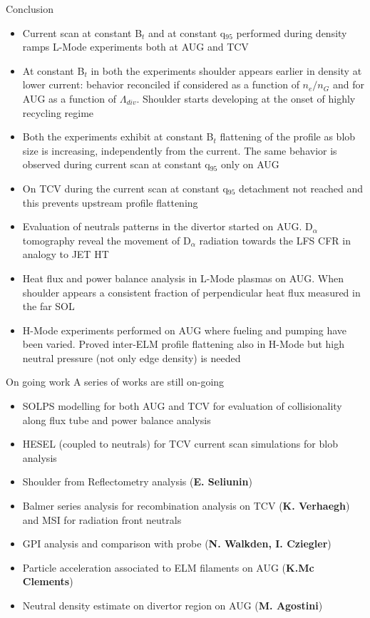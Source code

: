 \documentclass[10pt, compress]{beamer}
\newcommand\Fontvi{\fontsize{9}{8.2}\selectfont}
\begin{document}
\begin{frame}{Conclusion}
  \Fontvi
  \begin{itemize}
    \item Current scan at constant B$_t$ and at constant q$_{95}$
      performed during density ramps L-Mode experiments both at AUG
      and TCV
    \item At constant B$_t$ in both the experiments shoulder appears
      earlier in density at lower current: behavior reconciled if
      considered as a function of $n_e/n_G$ and for AUG as a function
      of $\Lambda_{div}$. \alert{Shoulder starts
        developing at the onset of highly recycling regime}
    \item Both the experiments exhibit at constant B$_t$ flattening of the profile as
      blob size is increasing, independently from the current. The
      same behavior is observed during current scan at constant
      q$_{95}$ \alert{only on AUG}
    \item On TCV during the current scan at constant q$_{95}$
      detachment not reached and this \alert{prevents upstream profile
        flattening}
    \item Evaluation of neutrals patterns in the divertor started on
      AUG. D$_{\alpha}$ tomography reveal the movement of D$_{\alpha}$
      radiation towards the LFS CFR in analogy to JET HT
    \item Heat flux and power balance analysis in L-Mode plasmas on
      AUG. When shoulder appears a consistent fraction of
      perpendicular heat flux measured in the far SOL
    \item H-Mode experiments performed on AUG where fueling and
      pumping have been varied. \alert{Proved inter-ELM profile flattening
      also in H-Mode} \alert{but high neutral pressure (not only edge
      density) is needed}
  \end{itemize}
\end{frame}

\begin{frame}{On going work}
  A series of works are still on-going 
  \begin{itemize}
    \item SOLPS modelling for both AUG and TCV for evaluation of
      collisionality along flux tube and power balance analysis
    \item HESEL (coupled to neutrals) for TCV current scan simulations
      for blob analysis
    \item Shoulder from Reflectometry analysis (\textbf{E. Seliunin})
    \item Balmer series analysis for
        recombination analysis on TCV (\textbf{K. Verhaegh}) and MSI for
      radiation front neutrals
    \item GPI analysis and comparison with probe
      (\textbf{N. Walkden, I. Cziegler})
    \item Particle acceleration associated to ELM filaments on AUG
      (\textbf{K.Mc Clements})
    \item Neutral density estimate on divertor region on AUG
      (\textbf{M. Agostini})  
  \end{itemize}
\end{frame}
\end{document}
